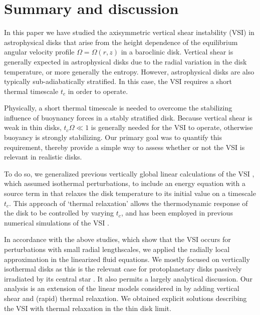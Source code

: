\section{Summary and discussion}\label{summary}
In this paper we have studied the axisymmetric vertical shear 
instability (VSI) in astrophysical disks that arise from the 
height dependence of the equilibrium angular velocity profile 
$\Omega=\Omega(r,z)$ in a baroclinic disk. Vertical shear is generally
expected in astrophysical disks due to the radial variation in the
disk temperature, or more generally the entropy. However, 
astrophysical disks are also typically sub-adiabatically stratified. 
In this case, the VSI requires a short thermal timescale $t_c$ in
order to operate.  

Physically, a short thermal timescale is needed to overcome the 
stabilizing influence of buoynancy forces in a stably stratified
disk. Because vertical shear is weak in thin disks, $t_c\Omega\ll 1$
is generally needed for the VSI to operate, otherwise buoyancy is
strongly stabilizing. Our primary goal was to quantify this
requirement, thereby provide a simple way to assess 
whether or not the VSI is relevant in realistic disks. 

To do so, we generalized previous vertically global linear 
calculations of the VSI \citep{nelson13,mcnally14,barker15}, which
assumed isothermal perturbations, to include an energy equation with 
a source term in that relaxes the disk
temperature to its initial value on a timescale
$t_c$. This approach of `thermal relaxation' allows
the thermodynamic response of the disk to be controlled by varying
$t_c$, and has been employed in previous numerical simulations of the
VSI \citep{nelson13}.  

In accordance with the above studies, which show that the VSI occurs for 
perturbations with small radial lengthscales, we applied the 
radially local approximation in the linearized fluid equations. 
We mostly focused on vertically isothermal disks as 
this is the relevant case for protoplanetary disks passively
irradiated by its central star \citep{chiang97}. It also permits a
largely analytical discussion. Our analysis is an extension of the
linear models considered in \cite{lubow93} by adding vertical shear
and (rapid) thermal relaxation. We obtained explicit solutions
describing the VSI with thermal relaxation in the thin disk limit.  

